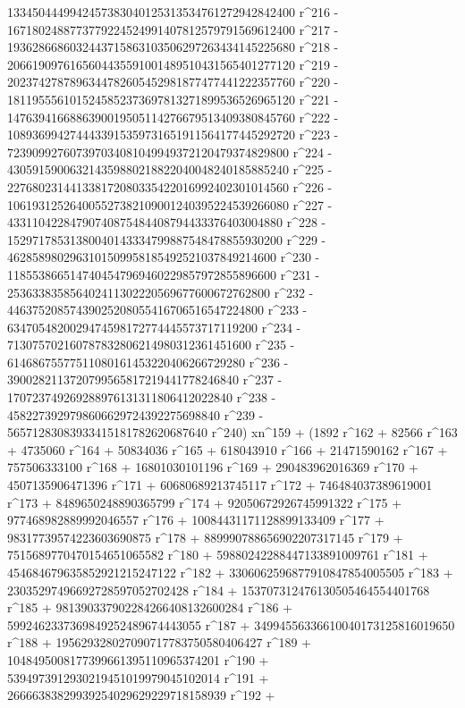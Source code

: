        1334504449942457383040125313534761272942842400 r^216 - 
       1671802488773779224524991407812579791569612400 r^217 - 
       1936286686032443715863103506297263434145225680 r^218 - 
       2066190976165604435591001489510431565401277120 r^219 - 
       2023742787896344782605452981877477441222357760 r^220 - 
       1811955561015245852373697813271899536526965120 r^221 - 
       1476394166886390019505114276679513409380845760 r^222 - 
       1089369942744433915359731651911564177445292720 r^223 - 
       723909927607397034081049949372120479374829800 r^224 - 
       430591590063214359880218822040048240185885240 r^225 - 
       227680231441338172080335422016992402301014560 r^226 - 
       106193125264005527382109001240395224539266080 r^227 - 
       43311042284790740875484408794433376403004880 r^228 - 
       15297178531380040143334799887548478855930200 r^229 - 
       4628589802963101509958185492521037849214600 r^230 - 
       1185538665147404547969460229857972855896600 r^231 - 
       253633835856402411302220569677600672762800 r^232 - 
       44637520857439025208055416706516547224800 r^233 - 
       6347054820029474598172774445573717119200 r^234 - 
       713075702160787832806214980312361451600 r^235 - 
       61468675577511080161453220406266729280 r^236 - 
       3900282113720799565817219441778246840 r^237 - 
       170723749269288976131311806412022840 r^238 - 
       4582273929798606629724392275698840 r^239 - 
       56571283083933415181782620687640 r^240) xn^159 + (1892 r^162 + 
       82566 r^163 + 4735060 r^164 + 50834036 r^165 + 
       618043910 r^166 + 21471590162 r^167 + 757506333100 r^168 + 
       16801030101196 r^169 + 290483962016369 r^170 + 
       4507135906471396 r^171 + 60680689213745117 r^172 + 
       746484037389619001 r^173 + 8489650248890365799 r^174 + 
       92050672926745991322 r^175 + 977468982889992046557 r^176 + 
       10084431171128899133409 r^177 + 
       98317739574223603690875 r^178 + 
       889990788656902207317145 r^179 + 
       7515689770470154651065582 r^180 + 
       59880242288447133891009761 r^181 + 
       454684679635852921215247122 r^182 + 
       3306062596877910847854005505 r^183 + 
       23035297496692728597052702428 r^184 + 
       153707312476130505464554401768 r^185 + 
       981390337902284266408132600284 r^186 + 
       5992462337369849252489674443055 r^187 + 
       34994556336610040173125816019650 r^188 + 
       195629328027090717783750580406427 r^189 + 
       1048495008177399661395110965374201 r^190 + 
       5394973912930219451019979045102014 r^191 + 
       26666383829939254029629229718158939 r^192 + 
